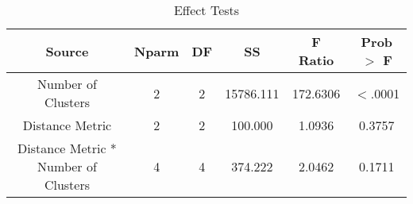 \documentclass[times]{article}
\begin{document}
   \begin{table}[H]
      \centering
      \caption{Effect Tests}
      \label{tab:effect}
      \begin{tabular}{| c | c | c | c | c | c |}
         \hline
         Source & 
            Nparm & DF &        SS & F Ratio  & Prob $>$ F \\
         \hline
         Number of Clusters &
            2     & 2  & 15786.111 & 172.6306 & $<$.0001 \\
         \hline
         Distance Metric &
            2     & 2  &   100.000 &   1.0936 & 0.3757 \\
         \hline
         Distance Metric * Number of Clusters &
            4     & 4  &   374.222 &   2.0462 & 0.1711 \\
         \hline
      \end{tabular}
   \end{table}
   
\end{document}
